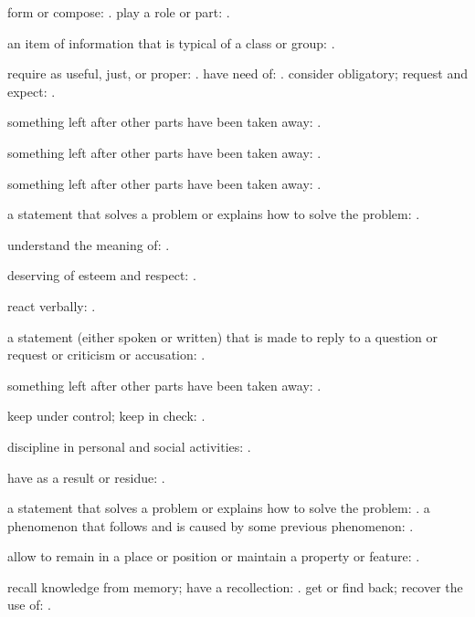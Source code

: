   form or compose:   . play a role or part: .

  an item of information that is typical of a class or group: .

  require as useful, just, or proper: . have need of: . consider obligatory; request and expect: .

  something left after other parts have been taken away: .

  something left after other parts have been taken away: .

  something left after other parts have been taken away: .

  a statement that solves a problem or explains how to solve the problem: .

  understand the meaning of: .

  deserving of esteem and respect: .

  react verbally: .

  a statement (either spoken or written) that is made to reply to a question or request or criticism or accusation: .

  something left after other parts have been taken away: .

  keep under control; keep in check: .

  discipline in personal and social activities: .

  have as a result or residue: .

  a statement that solves a problem or explains how to solve the problem: . a phenomenon that follows and is caused by some previous phenomenon: .

  allow to remain in a place or position or maintain a property or feature: .

  recall knowledge from memory; have a recollection: . get or find back; recover the use of: .

